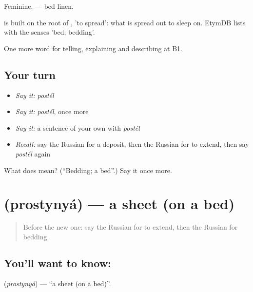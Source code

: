 Feminine. \emph{ } — bed linen.

\begin{cousinweb}
\emph{} is built on the root of \emph{}, \emph{} 'to spread': what is spread out to sleep on. EtymDB lists \emph{} with the senses 'bed; bedding'.
\end{cousinweb}

\begin{grammarlens}[title={What you've built}]
One more word for telling, explaining and describing at B1.
\end{grammarlens}

\subsection*{Your turn}
\begin{itemize}
\raggedright
  \item \emph{Say it:} \emph{postél}
  \item \emph{Say it:} \emph{postél}, once more
  \item \emph{Say it:} a sentence of your own with \emph{postél}
  \item \emph{Recall:} say the Russian for a deposit, then the Russian for to extend, then say \emph{postél} again
\end{itemize}

\begin{tcolorbox}[breakable,colback=teal!4,colframe=teal!35!black,title={Before you move on}]
What does  mean? (\textquotedblleft{}Bedding; a bed\textquotedblright{}.) Say it once more.
\end{tcolorbox}
\section[\texorpdfstring{\ru{простыня} (prostynyá)}{простыня (prostynyá)}]{ (prostynyá) — a sheet (on a bed)}

\label{lesson:RU-C430-prostynya}



\begin{quote}
Before the new one: say the Russian for to extend, then the Russian for bedding.
\end{quote}

\subsection*{You'll want to know: }
\textbf{} (\emph{prostynyá}) — \textquotedblleft{}a sheet (on a bed)\textquotedblright{}.

